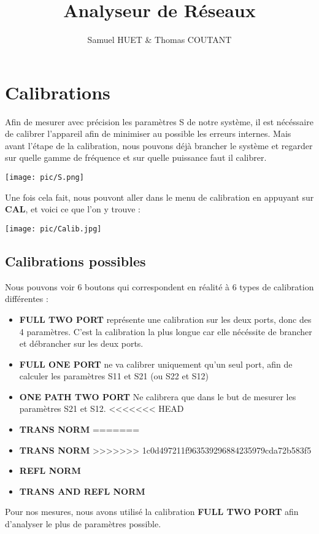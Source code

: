 \documentclass[a4paper,12pt]{report}            %
\author{Samuel HUET \& Thomas COUTANT}
\title{\huge{\textbf{Analyseur de Réseaux}}}
\begin{document}
\maketitle
\renewcommand{\contentsname}{SOMMAIRE} %
\tableofcontents

\chapter{Calibrations}

Afin de mesurer avec précision les paramètres S de notre système, il est nécéssaire de
calibrer l'appareil afin de minimiser au possible les erreurs internes. Mais avant l'étape
de la calibration, nous pouvons déjà brancher le système et regarder sur quelle gamme de
fréquence et sur quelle puissance faut il calibrer. 

\begin{center}\texttt{[image: pic/S.png]}\\ \end{center}

Une fois cela fait, nous pouvont aller
dans le menu de calibration en appuyant sur \textbf{CAL}, et voici ce que l'on y trouve :

\begin{center}\texttt{[image: pic/Calib.jpg]}\\ \end{center}

\newpage

\section{Calibrations possibles}
Nous pouvons voir 6 boutons qui correspondent en réalité à 6 types de calibration
différentes :
\begin{itemize}
	\item \textbf{FULL TWO PORT} représente une calibration sur les deux ports, donc des 4 paramètres.
	      C'est la calibration la plus longue car elle nécéssite de brancher et débrancher sur les deux ports.
	\item \textbf{FULL ONE PORT} ne va calibrer uniquement qu'un seul port, afin de calculer les paramètres
	      S11 et S21 (ou S22 et S12)
	\item \textbf{ONE PATH TWO PORT} Ne calibrera que dans le but de mesurer les paramètres S21 et S12.
<<<<<<< HEAD
	\item \textbf{TRANS NORM} 
=======
	\item \textbf{TRANS NORM}
>>>>>>> 1c0d497211f963539296884235979cda72b583f5
	\item \textbf{REFL NORM} 
	\item \textbf{TRANS AND REFL NORM}
\end{itemize}
Pour nos mesures, nous avons utilisé la calibration \textbf{FULL TWO PORT} afin
d'analyser le plus de paramètres possible.  
\end{document}
